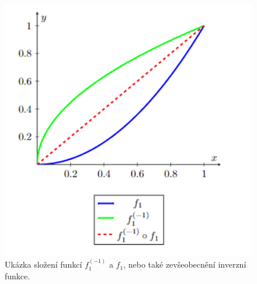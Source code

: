    \begin{figure}[H]
   \caption{ Ukázka složení funkcí $f_1^{(-1)} $ a $ f_1$, nebo také zevšeobecnění inverzní funkce.\\}
                \hspace{-1cm}
                \includegraphics[scale=0.75]{template-fig/inverz.pdf}
                \centering
    \end{figure}


